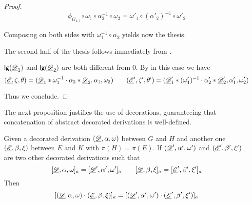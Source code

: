 \begin{proof}
	\[\phi_{G_{1,l}}\circ \omega_1\circ \alpha_2^{-1}\circ \omega_2=\omega'_1\circ (\alpha'_2)^{-1}\circ \omega'_2 \]
	 
	 Composing on both sides with $\omega^{-1}_1\circ \alpha_2$ yields now the thesis.
	 
The second half of the thesis follows immediately from .	
	
	\smallskip \noindent  $\mathsf{lg}(\underline{\mathscr{D}}_1)$ and $\mathsf{lg}(\underline{\mathscr{D}}_2)$ are both different from $0$. By  in this case we have
	\[(\underline{\mathscr{E}}, \zeta, \theta)=(\underline{\mathscr{D}}_1*\omega^{-1}_1 \cdot \alpha_2*\underline{\mathscr{D}}_2, \alpha_1,\omega_2 ) \qquad (\underline{\mathscr{E}}', \zeta', \theta')=(\underline{\mathscr{D}}'_1*(\omega'_1)^{-1} \cdot \alpha'_2*\underline{\mathscr{D}}'_2, \alpha'_1,\omega'_2 )\]
	
	Thus we conclude.
\end{proof}

The next proposition justifies the use of decorations, guaranteeing that concatenation of abstract decorated derivations is well-defined.
\begin{lemma}\label{lem:conc}
	Given a decorated derivation $(\underline{\mathscr{D}}, \alpha, \omega)$  between $G$ and $H$ and  another one $(\underline{\mathscr{E}}, \beta, \xi)$ between $E$ and $K$ with $\pi(H)=\pi(E)$. If  $(\underline{\mathscr{D}}', \alpha', \omega')$ and $(\underline{\mathscr{E}}', \beta', \xi')$ are two other decorated derivations such that
	\[[\underline{\mathscr{D}}, \alpha, \omega]_a = [\underline{\mathscr{D}}', \alpha', \omega']_a \qquad [\underline{\mathscr{D}}, \beta, \xi]_a=[\underline{\mathscr{E}}', \beta', \xi']_a\]
	Then
	\[[(\underline{\mathscr{D}}, \alpha, \omega)\cdot (\underline{\mathscr{E}}, \beta, \xi)]_a=[(\underline{\mathscr{D}}', \alpha', \omega')\cdot (\underline{\mathscr{E}}', \beta', \xi')]_a\]
\end{lemma}

